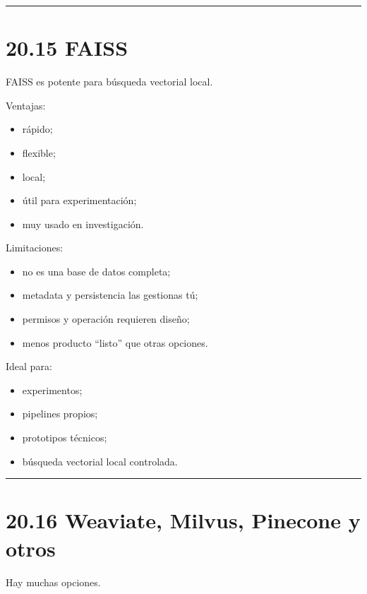 \begin{center}\rule{0.5\linewidth}{0.5pt}\end{center}

\section{20.15 FAISS}\label{faiss}

FAISS es potente para búsqueda vectorial local.

Ventajas:

\begin{itemize}
\tightlist
\item
  rápido;
\item
  flexible;
\item
  local;
\item
  útil para experimentación;
\item
  muy usado en investigación.
\end{itemize}

Limitaciones:

\begin{itemize}
\tightlist
\item
  no es una base de datos completa;
\item
  metadata y persistencia las gestionas tú;
\item
  permisos y operación requieren diseño;
\item
  menos producto ``listo'' que otras opciones.
\end{itemize}

Ideal para:

\begin{itemize}
\tightlist
\item
  experimentos;
\item
  pipelines propios;
\item
  prototipos técnicos;
\item
  búsqueda vectorial local controlada.
\end{itemize}

\begin{center}\rule{0.5\linewidth}{0.5pt}\end{center}

\section{20.16 Weaviate, Milvus, Pinecone y
otros}\label{weaviate-milvus-pinecone-y-otros}

Hay muchas opciones.

